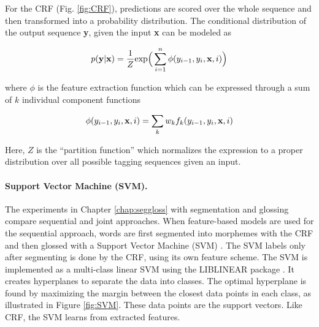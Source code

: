 
For the CRF (Fig. \ref{fig:CRF}), predictions are scored over the whole sequence and then transformed into a probability distribution. The conditional distribution of the output sequence {\bf y}, given the input {\bf x} can be modeled as

\begin{equation}
p(\mathbf{y}|\mathbf{x}) = \frac{1}{Z} \textrm{exp}\Big(\sum_{i=1}^n\phi(y_{i-1}, y_i,\mathbf{x},i)\Big)
\end{equation}

\noindent where $\phi$ is the feature extraction function which can be expressed through a sum of $k$ individual component functions

\begin{equation}
\phi(y_{i-1}, y_i,\mathbf{x},i) = \sum_k w_k f_k(y_{i-1}, y_i,\mathbf{x},i)
\end{equation}

\noindent Here, $Z$ is the ``partition function'' which normalizes the expression to a proper distribution over all possible tagging sequences given an input. 

\paragraph{Support Vector Machine (SVM).} The experiments in Chapter \ref{chap:seggloss} with segmentation and glossing compare sequential and joint approaches. When feature-based models are used for the sequential approach, words are first segmented into morphemes with the CRF and then glossed with a Support Vector Machine (SVM) \citep{svm_cortes}. The SVM labels only after segmenting is done by the CRF, using its own feature scheme. The SVM is implemented as a multi-class linear SVM using the LIBLINEAR package \citep{fan2008}. It creates hyperplanes to separate the data into classes. The optimal hyperplane is found by maximizing the margin between the closest data points in each class, as illustrated in Figure \ref{fig:SVM}. These data points are the support vectors. Like CRF, the SVM learns from extracted features.

